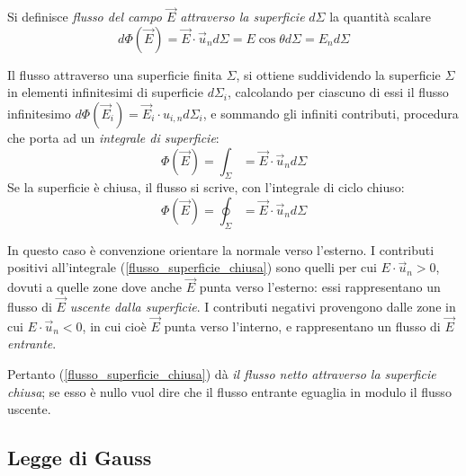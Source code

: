 \documentclass[class=book, crop=false, oneside, 12pt]{standalone}
\begin{document}
Si definisce \emph{flusso del campo \(\overrightarrow{E}\) attraverso la superficie} \(d \Sigma\) la quantità scalare 
\begin{equation} \label{definizione_flusso}
    d \Phi (\overrightarrow{E}) = \overrightarrow{E} \cdot \overrightarrow{u}_n d \Sigma = E \cos \theta d \Sigma = E_n d \Sigma
\end{equation}

Il flusso attraverso una superficie finita \(\Sigma\), si ottiene suddividendo la superficie \(\Sigma\) in elementi infinitesimi di superficie \(d \Sigma_i\), calcolando per ciascuno di essi il flusso infinitesimo \(d \Phi (\overrightarrow{E}_i) = \overrightarrow{E}_i \cdot u_{i,n} d \Sigma_i\), 
e sommando gli infiniti contributi, procedura che porta ad un \emph{integrale di superficie}:
\begin{equation}
    \Phi (\overrightarrow{E}) = \int_{\Sigma} = \overrightarrow{E} \cdot \overrightarrow{u}_n d \Sigma
\end{equation}
Se la superficie è chiusa, il flusso si scrive, con l'integrale di ciclo chiuso:
\begin{equation} \label{flusso_superficie_chiusa}
    \Phi (\overrightarrow{E}) = \oint_{\Sigma} = \overrightarrow{E} \cdot \overrightarrow{u}_n d \Sigma
\end{equation}

In questo caso è convenzione orientare la normale verso l'esterno. 
I contributi positivi all'integrale (\ref{flusso_superficie_chiusa}) sono quelli per cui \(E \cdot \overrightarrow{u}_n> 0\), dovuti a quelle zone dove anche \(\overrightarrow{E}\) punta verso l'esterno: essi rappresentano un flusso di \(\overrightarrow{E}\) \emph{uscente dalla superficie}. 
I contributi negativi provengono dalle zone in cui \(E \cdot \overrightarrow{u}_n < 0\), in cui cioè \(\overrightarrow{E}\) punta verso l'interno, e rappresentano un flusso di \(\overrightarrow{E}\) \emph{entrante}. 

Pertanto (\ref{flusso_superficie_chiusa}) dà \emph{il flusso netto attraverso la superficie chiusa}; se esso è nullo vuol dire che il flusso entrante eguaglia in modulo il flusso uscente.

\subsection{Legge di Gauss}
\end{document}

